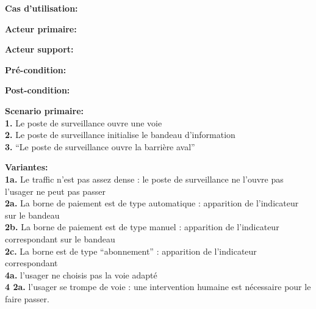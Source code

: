 \textbf{Cas d'utilisation:}

\textbf{Acteur primaire:}

\textbf{Acteur support:}

\textbf{Pré-condition: } 
 
\textbf{Post-condition: } 

\textbf{Scenario primaire: } \\
    \textbf{1.} Le poste de surveillance ouvre une voie \\
    \textbf{2.} Le poste de surveillance initialise le bandeau d’information \\
    \textbf{3.} “Le poste de surveillance ouvre la barrière aval”

\textbf{Variantes:}\\
    \textbf{1a.} Le traffic n’est pas assez dense : le poste de surveillance ne l’ouvre pas
	l’usager ne peut pas passer \\
    \textbf{2a.} La borne de paiement est de type automatique : apparition de l’indicateur sur le bandeau\\
    \textbf{2b.} La borne de paiement est de type manuel : apparition de l’indicateur correspondant sur le bandeau\\
    \textbf{2c.} La borne est de type “abonnement” : apparition de l’indicateur correspondant \\
    \textbf{4a.} l’usager ne choisis pas la voie adapté \\
    \textbf{4 2a.} l’usager se trompe de voie : une intervention humaine est nécessaire pour le faire passer.\\